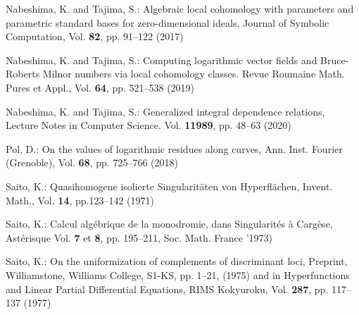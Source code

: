 \documentclass[pdftex]{arxsigma}
\begin{document}
\begin{thebibliography}{99}
Nabeshima, K.  and Tajima, S.:
\newblock Algebraic local cohomology with parameters and 
parametric standard bases for zero-dimensional ideals, 
\newblock Journal of Symbolic Computation,
Vol. {\bf 82}, pp. 91--122 (2017)










Nabeshima, K. and Tajima, S.: 
\newblock Computing logarithmic vector fields and Bruce-Roberts Milnor numbers via local cohomology classes.
\newblock Revue Roumaine Math. Pures et Appl.,
Vol. {\bf 64}, pp. 521--538 (2019)






Nabeshima, K.  and Tajima, S.:
\newblock Generalized integral dependence relations, 
\newblock Lecture Notes in Computer Science.
Vol. {\bf 11989}, pp. 48--63 (2020)






Pol, D.:
\newblock On the values of logarithmic residues along curves, 
\newblock Ann. Inst. Fourier (Grenoble),
Vol. {\bf 68}, pp. 725--766 (2018) 

Saito, K.: 
\newblock Quasihomogene isolierte Singularit\"aten von Hyperfl\"achen, 
\newblock Invent. Math.,
Vol. {\bf 14}, pp.123--142 (1971)

Saito, K.:
\newblock Calcul alg\'ebrique de la monodromie, dans Singularit\'es \` a Carg\`ese, 
\newblock Ast\'erisque 
Vol. {\bf 7} et {\bf 8}, pp. 195--211, Soc. Math. France '1973)

Saito, K.:
\newblock On the uniformization of complements of discriminant loci, 
\newblock Preprint, Williamstone, Williams College, S1-KS, pp. 1--21, (1975) and 
\newblock in Hyperfunctions and Linear Partial Differential Equations, RIMS Kokyuroku, 
Vol. {\bf 287}, pp. 117--137 (1977)


\end{thebibliography}
\end{document}
